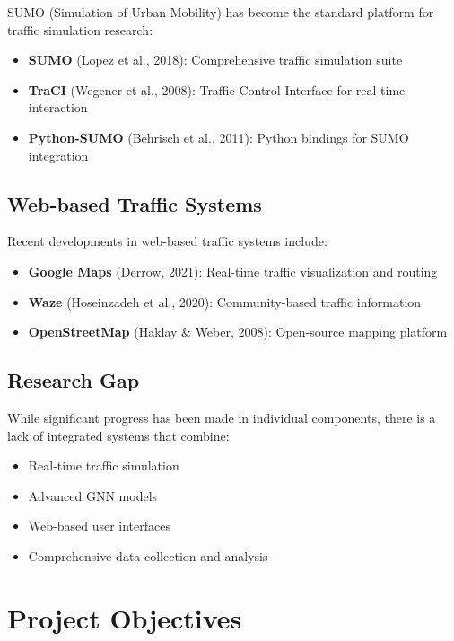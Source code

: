 \documentclass[12pt,a4paper]{article}
\begin{document}
SUMO (Simulation of Urban Mobility) has become the standard platform for traffic simulation research:

\begin{itemize}
    \item \textbf{SUMO} (Lopez et al., 2018): Comprehensive traffic simulation suite
    \item \textbf{TraCI} (Wegener et al., 2008): Traffic Control Interface for real-time interaction
    \item \textbf{Python-SUMO} (Behrisch et al., 2011): Python bindings for SUMO integration
\end{itemize}

\subsection{Web-based Traffic Systems}

Recent developments in web-based traffic systems include:

\begin{itemize}
    \item \textbf{Google Maps} (Derrow, 2021): Real-time traffic visualization and routing
    \item \textbf{Waze} (Hoseinzadeh et al., 2020): Community-based traffic information
    \item \textbf{OpenStreetMap} (Haklay \& Weber, 2008): Open-source mapping platform
\end{itemize}

\subsection{Research Gap}

While significant progress has been made in individual components, there is a lack of integrated systems that combine:
\begin{itemize}
    \item Real-time traffic simulation
    \item Advanced GNN models
    \item Web-based user interfaces
    \item Comprehensive data collection and analysis
\end{itemize}

\section{Project Objectives}
\end{document}

